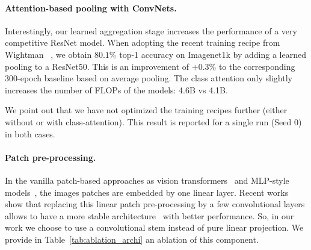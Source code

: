 \paragraph{Attention-based pooling with ConvNets.}

Interestingly, our learned aggregation stage increases the performance of a very competitive ResNet model. When adopting the recent training recipe from Wightman \etal~\cite{wightman2021resnet}, %
we obtain $80.1\%$ top-1 accuracy on Imagenet1k by adding a learned pooling to a ResNet50. This is an improvement of $+0.3\%$ to the corresponding 300-epoch baseline based on average pooling. 
%
The class attention  only slightly increases the number of FLOPs of the models:
4.6B vs 4.1B. %

We point out that we have not optimized the training recipes further (either without or with class-attention). This result is reported for a single run (Seed 0) in both cases. 


\paragraph{Patch pre-processing.} 
In the vanilla patch-based approaches as vision transformers~\cite{dosovitskiy2020image,Touvron2020TrainingDI} and MLP-style models~\cite{tolstikhin2021MLPMixer,Touvron2021ResMLPFN}, the images patches are embedded by one linear layer.
Recent works~\cite{graham2021levit,Xiao2021EarlyCH} show that replacing this linear patch pre-processing by a few convolutional layers allows to have a more stable architecture~\cite{Xiao2021EarlyCH} with better performance.
So, in our work we choose to use a convolutional stem instead of pure linear projection.
We provide in Table~\ref{tab:ablation_archi} an ablation of this component.








